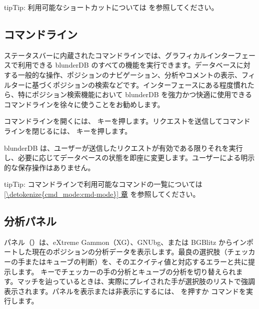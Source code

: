 \documentclass[letterpaper,10pt,dvipdfmx]{sphinxmanual}
\begin{document}
\begin{sphinxadmonition}{tip}{Tip:}
\sphinxAtStartPar
利用可能なショートカットについては {\hyperref[\detokenize{raccourcis:raccourcis}]{}} を参照してください。
\end{sphinxadmonition}


\subsection{コマンドライン}
\label{\detokenize{manuel:la-ligne-de-commande}}\label{\detokenize{manuel:ligne-commande}}
\sphinxAtStartPar
ステータスバーに内蔵されたコマンドラインでは、グラフィカルインターフェースで利用できる blunderDB のすべての機能を実行できます。データベースに対する一般的な操作、ポジションのナビゲーション、分析やコメントの表示、フィルターに基づくポジションの検索などです。インターフェースにある程度慣れたら、特にポジション検索機能において blunderDB を強力かつ快適に使用できるコマンドラインを徐々に使うことをお勧めします。

\sphinxAtStartPar
コマンドラインを開くには、 キーを押します。リクエストを送信してコマンドラインを閉じるには、 キーを押します。

\sphinxAtStartPar
blunderDB は、ユーザーが送信したリクエストが有効である限りそれを実行し、必要に応じてデータベースの状態を即座に変更します。ユーザーによる明示的な保存操作はありません。

\begin{sphinxadmonition}{tip}{Tip:}
\sphinxAtStartPar
コマンドラインで利用可能なコマンドの一覧については \hyperref[\detokenize{cmd_mode:cmd-mode}]{\ref{\detokenize{cmd_mode:cmd-mode}} 章} を参照してください。
\end{sphinxadmonition}


\subsection{分析パネル}
\label{\detokenize{manuel:panneau-analyse}}\label{\detokenize{manuel:id3}}
\sphinxAtStartPar
{} パネル（）は、eXtreme Gammon（XG）、GNUbg、または BGBlitz からインポートした現在のポジションの分析データを表示します。最良の選択肢（チェッカーの手またはキューブの判断）を、そのエクイティ値と対応するエラーと共に提示します。 キーでチェッカーの手の分析とキューブの分析を切り替えられます。マッチを辿っているときは、実際にプレイされた手が選択肢のリストで強調表示されます。パネルを表示または非表示にするには、 を押すか  コマンドを実行します。
\end{document}
